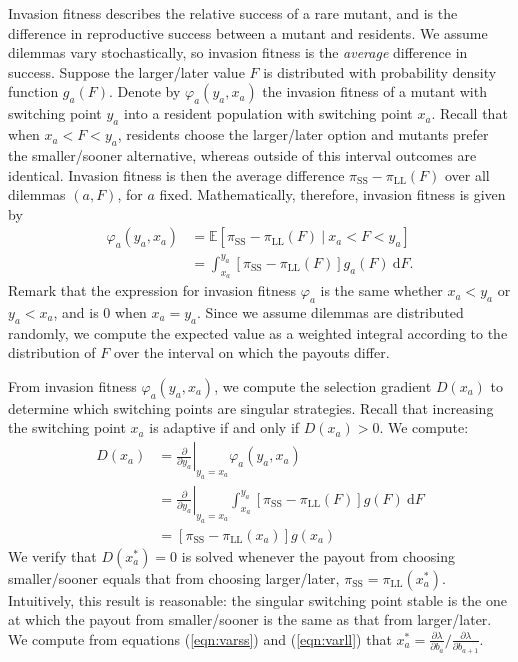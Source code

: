 \documentclass[titlepage, hidelinks, 12pt]{article}
\theoremstyle{plain}
\theoremstyle{remark}
\theoremstyle{definition}
\newcommand{\varSS}{\frac{\partial \lambda}{ \partial b_{a}}}
\newcommand{\varLL}{\frac{\partial \lambda}{ \partial b_{a+1}}}
\DeclareMathOperator{\smallersooner}{SS}
\DeclareMathOperator{\largerlater}{LL}
\renewcommand\d[1]{\:\textrm{d}#1}
\begin{document}
Invasion fitness describes the relative success of a rare mutant, and is the difference in reproductive success between
a mutant and residents.  We assume dilemmas
vary stochastically, so invasion fitness is the \textit{average} difference in success. Suppose the larger/later value $F$ is distributed with probability
density function $g_a(F)$. 
Denote by $\varphi_a(y_a, x_a)$ the invasion fitness of a mutant with switching point
$y_a$ into a resident population with switching point $x_a$.  
Recall that when $x_a < F < y_a$, residents choose the larger/later option and mutants prefer the smaller/sooner alternative, whereas
outside of this interval outcomes are identical. Invasion fitness is then the average difference $\pi_{\smallersooner} - \pi_{\largerlater}(F)$
over all dilemmas $(a, F)$, for $a$ fixed. 
Mathematically, therefore, invasion fitness is given by 
\begin{align}
    \varphi_a(y_a, x_a) &= \mathbb{E}\left[ \pi_{\smallersooner} - \pi_{\largerlater}(F) \ | \ x_a < F < y_a\right] \\
    &= \int_{x_a}^{y_a} \left[ \pi_{\smallersooner} - \pi_{\largerlater}(F) \right]g_a(F) \d F. 
\end{align}
Remark that the expression for invasion fitness
$\varphi_a$ is the same whether $x_a < y_a$ or $y_a < x_a$, and is $0$ when $x_a = y_a$. 
Since we assume dilemmas are distributed randomly, we compute the expected value as a weighted integral according to the distribution of $F$ over
the interval on which the payouts differ. 

From invasion fitness $\varphi_a(y_a, x_a)$, we compute the selection gradient $D(x_a)$ to determine which switching points
are singular strategies.  
Recall that increasing the switching point $x_a$ is adaptive if and only if $D(x_a) > 0$. We compute: 
\begin{align}
    D(x_a) &= \left.\frac{\partial }{\partial y_a} \right\vert_{y_a = x_a}\varphi_a(y_a, x_a)  \\
    &=\left.\frac{\partial }{\partial y_a} \right\vert_{y_a = x_a}  \int_{x_a}^{y_a} \left[ \pi_{\smallersooner} - \pi_{\largerlater}(F) \right]g(F) \d F\\
        &=\left[ \pi_{\smallersooner} - \pi_{\largerlater}(x_a)   \right]g(x_a) 
\end{align}
We verify that $D(x_a^*) = 0$ is solved whenever the payout from choosing smaller/sooner equals that from choosing larger/later,
$\pi_{\smallersooner} = \pi_{\largerlater}(x_a^*)$. Intuitively, this result is reasonable: the singular switching point 
stable is the one at which the payout from smaller/sooner is the same as that from larger/later. 
We compute from equations (\ref{eqn:varss}) and (\ref{eqn:varll}) that
$x_a^* =  \varSS/\varLL$. 
\end{document}
